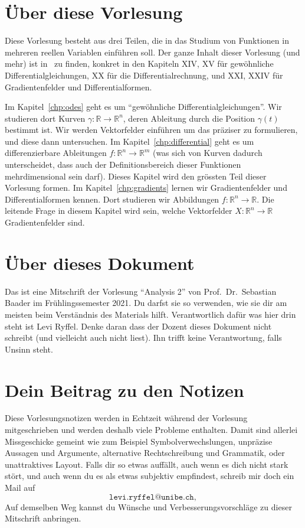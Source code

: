 \documentclass[../main.tex]{subfiles}
\begin{document}
\section*{Über diese Vorlesung}
Diese Vorlesung besteht aus drei Teilen,
die in das Studium von Funktionen
in mehreren reellen Variablen
einführen soll. Der ganze Inhalt
dieser Vorlesung (und mehr) ist in~\cite{heuser}
zu finden,
konkret in den Kapiteln XIV, XV für
gewöhnliche Differentialgleichungen,
XX für die Differentialrechnung,
und XXI, XXIV für Gradientenfelder
und Differentialformen.

Im Kapitel~\ref{chp:odes} geht es um
``gewöhnliche Differentialgleichungen''.
Wir studieren dort Kurven
$\gamma \colon \mathbb{R} \to \mathbb{R}^n$,
deren Ableitung durch die
Position $\gamma(t)$ bestimmt ist.
Wir werden Vektorfelder einführen
um das präziser zu formulieren,
und diese dann untersuchen.
Im Kapitel~\ref{chp:differential}
geht es um differenzierbare
Ableitungen
$f \colon \mathbb{R}^n \to \mathbb{R}^m$
(was sich von Kurven dadurch unterscheidet,
dass auch der Definitionsbereich
dieser Funktionen mehrdimensional sein darf).
Dieses Kapitel wird den grössten Teil
dieser Vorlesung formen.
Im Kapitel~\ref{chp:gradients} lernen
wir Gradientenfelder und Differentialformen
kennen. Dort studieren wir
Abbildungen $f \colon\mathbb{R}^n \to \mathbb{R}$.
Die leitende Frage in diesem Kapitel wird sein,
welche Vektorfelder $X \colon \mathbb{R}^n
\to \mathbb{R}$ Gradientenfelder sind.




\section*{Über dieses Dokument}
Das ist eine Mitschrift
der Vorlesung ``Analysis 2''
von Prof.\ Dr.\ Sebastian Baader
im Frühlingssemester 2021.
Du darfst sie so verwenden,
wie sie dir am meisten
beim Verständnis des Materials
hilft.
Verantwortlich dafür was
hier drin steht ist Levi Ryffel.
Denke daran dass der Dozent dieses Dokument
nicht schreibt (und vielleicht auch nicht liest).
Ihn trifft keine Verantwortung, falls
Unsinn steht.

\section*{Dein Beitrag zu den Notizen}
Diese Vorlesungsnotizen werden in Echtzeit während der Vorlesung mitgeschrieben
und werden deshalb viele Probleme enthalten.
Damit sind allerlei Missgeschicke
gemeint wie zum Beispiel
Symbolverwechslungen, unpräzise Aussagen und Argumente,
alternative Rechtschreibung und Grammatik,
oder unattraktives Layout.
Falls dir so etwas auffällt,
auch wenn es dich nicht stark stört,
und auch wenn du es
als etwas subjektiv empfindest,
schreib mir doch ein Mail auf
\[
\texttt{levi.ryffel@unibe.ch},
\]
Auf demselben Weg kannst du Wünsche
und Verbesserungsvorschläge
zu dieser Mitschrift
anbringen.
\end{document}
